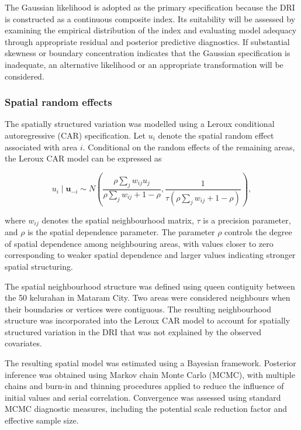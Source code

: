 \documentclass[
  default,
]{sn-jnl}
\begin{document}
The Gaussian likelihood is adopted as the primary specification because
the DRI is constructed as a continuous composite index. Its suitability
will be assessed by examining the empirical distribution of the index
and evaluating model adequacy through appropriate residual and posterior
predictive diagnostics. If substantial skewness or boundary
concentration indicates that the Gaussian specification is inadequate,
an alternative likelihood or an appropriate transformation will be
considered.

\subsubsection{Spatial random effects}\label{spatial-random-effects}

The spatially structured variation was modelled using a Leroux
conditional autoregressive (CAR) specification. Let \(u_i\) denote the
spatial random effect associated with area \(i\). Conditional on the
random effects of the remaining areas, the Leroux CAR model can be
expressed as

\[
u_i \mid \mathbf{u}_{-i}
\sim
N\left(
\frac{\rho \sum_j w_{ij}u_j}
{\rho \sum_j w_{ij} + 1-\rho},
\frac{1}
{\tau\left(\rho \sum_j w_{ij}+1-\rho\right)}
\right),
\]

where \(w_{ij}\) denotes the spatial neighbourhood matrix, \(\tau\) is a
precision parameter, and \(\rho\) is the spatial dependence parameter.
The parameter \(\rho\) controls the degree of spatial dependence among
neighbouring areas, with values closer to zero corresponding to weaker
spatial dependence and larger values indicating stronger spatial
structuring.

The spatial neighbourhood structure was defined using queen contiguity
between the 50 kelurahan in Mataram City. Two areas were considered
neighbours when their boundaries or vertices were contiguous. The
resulting neighbourhood structure was incorporated into the Leroux CAR
model to account for spatially structured variation in the DRI that was
not explained by the observed covariates.

The resulting spatial model was estimated using a Bayesian framework.
Posterior inference was obtained using Markov chain Monte Carlo (MCMC),
with multiple chains and burn-in and thinning procedures applied to
reduce the influence of initial values and serial correlation.
Convergence was assessed using standard MCMC diagnostic measures,
including the potential scale reduction factor and effective sample
size.
\end{document}
